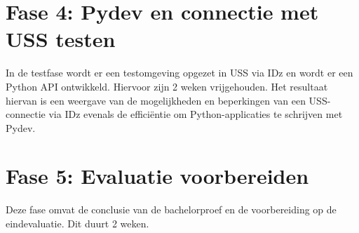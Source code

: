 \section{Fase 4: Pydev en connectie met USS testen}
\label{sec:m-verdere-configuratie}
In de testfase wordt er een testomgeving opgezet in USS via IDz en wordt er een Python API ontwikkeld. Hiervoor zijn 2 weken vrijgehouden. Het resultaat hiervan is een weergave van de mogelijkheden en beperkingen van een USS-connectie via IDz evenals de efficiëntie om Python-applicaties te schrijven met Pydev. 
%    

\section{Fase 5: Evaluatie voorbereiden}
\label{sec:m-evaluatie-voorbereiding}
Deze fase omvat de conclusie van de bachelorproef en de voorbereiding op de eindevaluatie. Dit duurt 2 weken.


